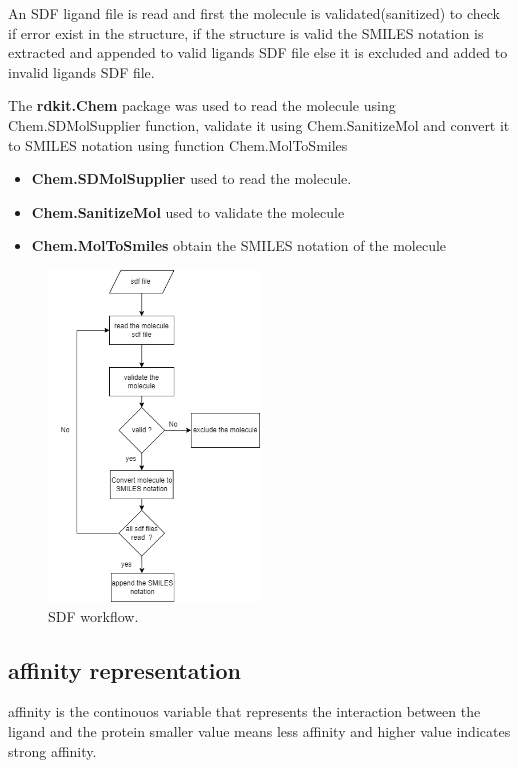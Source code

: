 \documentclass[11pt, a4paper]{article}
\begin{document}
    An SDF ligand file is read and first the molecule is validated(sanitized) to check if error exist in the structure, if the structure is valid the SMILES notation
    is extracted and appended to valid ligands SDF file else it is excluded and added to invalid ligands SDF file.

    The \textbf{rdkit.Chem} package \cite{7} was used to read the molecule using Chem.SDMolSupplier function, validate it using Chem.SanitizeMol and convert it to SMILES notation
    using function Chem.MolToSmiles

    \begin{itemize}
        \item \textbf{Chem.SDMolSupplier} used to read the molecule.
        \item \textbf{Chem.SanitizeMol} used to validate the molecule             
        \item \textbf{Chem.MolToSmiles} obtain the SMILES notation of the molecule 
    \end{itemize}

    \begin{figure}[h]
        \centering
        \includegraphics[width=0.5\textwidth]{sdf parser.png} %
        \caption{SDF workflow.}
        \label{fig 7}
    \end{figure}

    \subsection{affinity representation}
        affinity is the continouos variable that represents the interaction between the ligand and the protein smaller value means less affinity and 
        higher value indicates strong affinity.
\end{document}
